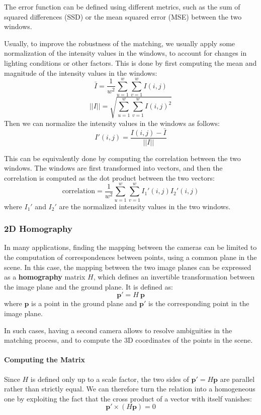 The error function can be defined using different metrics, such as the sum of squared differences (SSD) or the mean squared error (MSE) between the two windows.

Usually, to improve the robustness of the matching, we usually apply some normalization of the intensity values in the windows, to account for changes in lighting conditions or other factors.
This is done by first computing the mean and magnitude of the intensity values in the windows:
\[ \bar{I} = \frac{1}{w^2} \sum_{u=1}^{w} \sum_{v=1}^{w} I(i, j) \]
\[ ||I|| = \sqrt{\sum_{u=1}^{w} \sum_{v=1}^{w} I(i, j)^2} \]
Then we can normalize the intensity values in the windows as follows:
\[ I'(i, j) = \frac{I(i, j) - \bar{I}}{||I||} \]

This can be equivalently done by computing the correlation between the two windows.
The windows are first transformed into vectors, and then the correlation is computed as the dot product between the two vectors:
\[ \text{correlation} = \frac{1}{w^2} \sum_{u=1}^{w} \sum_{v=1}^{w} I_1'(i, j) I_2'(i, j) \]
where \( I_1' \) and \( I_2' \) are the normalized intensity values in the two windows.


\subsubsection{2D Homography}
In many applications, finding the mapping between the cameras can be limited to the computation of correspondences between points,
using a common plane in the scene.
In this case, the mapping between the two image planes can be expressed as a \textbf{homography} matrix $H$, which defines an invertible
transformation between the image plane and the ground plane.
It is defined as:
\[ \boldsymbol{p}' = H \: \boldsymbol{p} \]
where $\boldsymbol{p}$ is a point in the ground plane and $\boldsymbol{p}'$ is the corresponding point in the image plane.

In such cases, having a second camera allows to resolve ambiguities in the matching process, and to compute the 3D coordinates of the points in the scene.

\paragraph{Computing the Matrix}
Since $H$ is defined only up to a scale factor, the two sides of $\boldsymbol{p}' = H\boldsymbol{p}$ are parallel rather than strictly equal.
We can therefore turn the relation into a homogeneous one by exploiting the fact that the cross product of a vector with itself vanishes:
\[ \boldsymbol{p}' \times (H\boldsymbol{p}) = 0 \]

